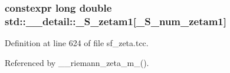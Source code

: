 \subsubsection[{\texorpdfstring{\+\_\+\+S\+\_\+zetam1}{_S_zetam1}}]{\setlength{\rightskip}{0pt plus 5cm}constexpr long double std\+::\+\_\+\+\_\+detail\+::\+\_\+\+S\+\_\+zetam1\mbox{[}{\bf \+\_\+\+S\+\_\+num\+\_\+zetam1}\mbox{]}}\hypertarget{namespacestd_1_1____detail_a22ed80d9e5c3bc79e61a3cdb8e79a462}{}\label{namespacestd_1_1____detail_a22ed80d9e5c3bc79e61a3cdb8e79a462}


Definition at line 624 of file sf\+\_\+zeta.\+tcc.



Referenced by \+\_\+\+\_\+riemann\+\_\+zeta\+\_\+m\+\_().

